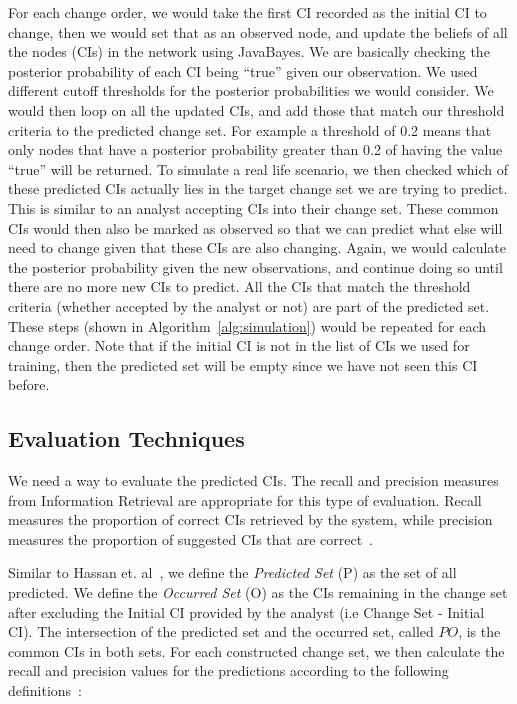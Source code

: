 \documentclass[10pt,twocolumn,letterpaper]{article}
\begin{document}
For each change order, we would take the first CI recorded as the initial CI to change, then we would set that as an observed node, and update
the beliefs of all the nodes (CIs) in the network using JavaBayes. We are basically checking the posterior probability of each CI being ``true'' given our
observation. We used different cutoff thresholds for the posterior probabilities we would consider. We would then loop on all the updated CIs, and add those
that match our threshold criteria to the predicted change set. For example a threshold of 0.2 means that only nodes that have a posterior probability greater
than 0.2 of having the value ``true'' will be returned. To simulate a real life scenario, we then checked which of these predicted CIs actually lies in the
target change set we are trying to predict. This is similar to an analyst accepting CIs into their change set. These common CIs would then also be marked as
observed so that we can predict what else will need to change given that these CIs are also changing. Again, we would calculate the posterior probability given
the new observations, and continue doing so until there are no more new CIs to predict. All the CIs that match the threshold criteria (whether accepted by the
analyst
or not) are part of the predicted set. These steps (shown in Algorithm~\ref{alg:simulation}) would be repeated for each change order. Note that if the initial
CI is not in the list of CIs we used for training, then the predicted set will be empty since we have not seen this CI before.

\subsection{Evaluation Techniques}

We need a way to evaluate the predicted CIs. The recall and precision measures from Information Retrieval are appropriate for this type of evaluation.
Recall measures the proportion of correct CIs retrieved by the system, while precision measures the proportion of suggested CIs that are correct~\cite{van79}.

Similar to Hassan et. al~\cite{hassan2004predicting}, we define the \textit{Predicted Set} (P) as the set of all predicted. We define the \textit{Occurred
Set} (O) as the CIs remaining in the change set after excluding the Initial CI
provided by the analyst (i.e Change Set - Initial CI). The intersection of the predicted set and the occurred set, called $PO$, is the common CIs in both sets.
For each constructed change set, we then calculate the recall and precision values for the predictions according to the following
definitions~\cite{hassan2004predicting}:
\end{document}
